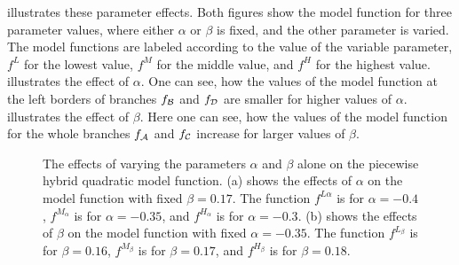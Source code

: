  illustrates these parameter effects.
Both figures show the model function for three parameter values, where either $\alpha$ or $\beta$ is fixed, and the other parameter is varied.
The model functions are labeled according to the value of the variable parameter, $f^L$ for the lowest value, $f^M$ for the middle value, and $f^H$ for the highest value.
 illustrates the effect of $\alpha$.
One can see, how the values of the model function at the left borders of branches $f_{\mathcal{B}}$ and $f_{\mathcal{D}}$ are smaller for higher values of $\alpha$.
 illustrates the effect of $\beta$.
Here one can see, how the values of the model function for the whole branches $f_{\mathcal{A}}$ and $f_{\mathcal{C}}$ increase for larger values of $\beta$.

\begin{figure}
	\centering
	\caption[The effects of single parameters on the piecewise hybrid quadratic model function]{
		The effects of varying the parameters $\alpha$ and $\beta$ alone on the piecewise hybrid quadratic model function.
		(a) shows the effects of $\alpha$ on the model function with fixed $\beta = 0.17$.
		The function $f^{L\alpha}$ is for $\alpha = -0.4$, $f^{M_\alpha}$ is for $\alpha = -0.35$, and $f^{H_\alpha}$ is for $\alpha = -0.3$.
		(b) shows the effects of $\beta$ on the model function with fixed $\alpha = -0.35$.
		The function $f^{L_\beta}$ is for $\beta = 0.16$, $f^{M_\beta}$ is for $\beta = 0.17$, and $f^{H_\beta}$ is for $\beta = 0.18$.
	}
	\label{fig:setup.arch.paramfx}
\end{figure}

